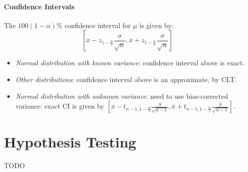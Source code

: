 \documentclass[twocolumn,english]{article}
\begin{document}
\paragraph{Confidence Intervals}

The $100\left(1-\alpha\right)\%$ confidence interval for $\mu$ is
given by:
\[
\left[\overline{x}-z_{1-\frac{\alpha}{2}}\frac{\sigma}{\sqrt{n}},\overline{x}+z_{1-\frac{\alpha}{2}}\frac{\sigma}{\sqrt{n}}\right]
\]
\begin{itemize}
\item \emph{Normal distribution with known variance}: confidence interval
above is exact.
\item \emph{Other distributions}: confidence interval above is an approximate,
by CLT.
\item \emph{Normal distribution with unknown variance}: need to use bias-corrected
variance: exact CI is given by $\left[\overline{x}-t_{n-1,1-\frac{\alpha}{2}}\frac{S}{\sqrt{n-1}},\overline{x}+t_{n-1,1-\frac{\alpha}{2}}\frac{S}{\sqrt{n-1}}\right]$.
\end{itemize}

\section{Hypothesis Testing}

TODO
\end{document}
